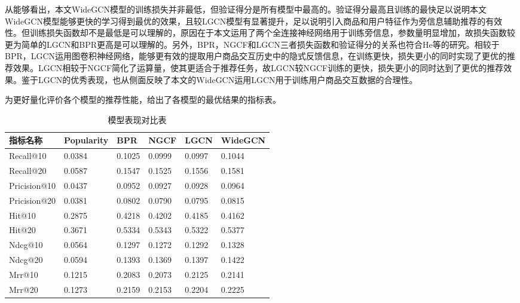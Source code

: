 \documentclass[lang=cn,11pt,a4paper,cite=authoryear]{elegantpaper}
\begin{document}
从能够看出，本文WideGCN模型的训练损失并非最低，但验证得分是所有模型中最高的。验证得分最高且训练的最快足以说明本文WideGCN模型能够更快的学习得到最优的效果，且较LGCN模型有显著提升，足以说明引入商品和用户特征作为旁信息辅助推荐的有效性。但训练损失函数却不是最低是可以理解的，原因在于本文运用了两个全连接神经网络用于训练旁信息，参数量明显增加，故损失函数较更为简单的LGCN和BPR更高是可以理解的。另外，BPR，NGCF和LGCN三者损失函数和验证得分的关系也符合He\cite{he_lightgcn_2020}等的研究。相较于BPR，LGCN运用图卷积神经网络，能够更有效的提取用户商品交互历史中的隐式反馈信息，在训练更快，损失更小的同时实现了更优的推荐效果。LGCN相较于NGCF简化了运算量，使其更适合于推荐任务，故LGCN较NGCF训练的更快，损失更小的同时达到了更优的推荐效果。鉴于LGCN的优秀表现，也从侧面反映了本文的WideGCN运用LGCN用于训练用户商品交互数据的合理性。

为更好量化评价各个模型的推荐性能，给出了各模型的最优结果的指标表。
  \begin{table}[!htb]
    \centering
    \caption{模型表现对比表}
      \huge
      \begin{tabular}{C{2cm}|C{1.5cm}|C{1.5cm}|C{1.5cm}|C{1.5cm}|C{1.5cm}}
      \hline
      \textbf{指标名称} & \textbf{Popularity} & \textbf{BPR} & \textbf{NGCF} & \textbf{LGCN} & \textbf{WideGCN} \\
      \hline
      Recall@10 & 0.0384 & 0.1025 & 0.0999 & 0.0997 & 0.1044\\
      Recall@20 & 0.0587 & 0.1547 & 0.1525 & 0.1556 & 0.1581\\
      Pricision@10 & 0.0437 & 0.0952 & 0.0927 & 0.0928 & 0.0964\\
      Pricision@20 & 0.0381 & 0.0802 & 0.0790 & 0.0795 & 0.0815\\
      Hit@10 & 0.2875 & 0.4218 & 0.4202 & 0.4185 & 0.4162 \\
      Hit@20 & 0.3671 & 0.5334 & 0.5343 & 0.5322 & 0.5377 \\
      Ndcg@10 & 0.0564 & 0.1297 & 0.1272 & 0.1292 & 0.1328 \\
      Ndcg@20 & 0.0594 & 0.1393 & 0.1369 & 0.1397 & 0.1422 \\
      Mrr@10 & 0.1215 & 0.2083 & 0.2073 & 0.2125 & 0.2141 \\
      Mrr@20 & 0.1273 & 0.2159 & 0.2153 & 0.2204 & 0.2225 \\
      \hline
      \end{tabular}
    \label{模型实验指标结果}
  \end{table}
\end{document}
